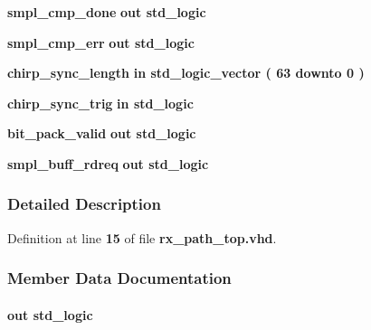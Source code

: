 \begin{DoxyCompactItemize}
\item 
{\bf smpl\+\_\+cmp\+\_\+done}  {\bfseries {\bfseries \textcolor{keywordflow}{out}\textcolor{vhdlchar}{ }}} {\bfseries \textcolor{comment}{std\+\_\+logic}\textcolor{vhdlchar}{ }} 
\item 
{\bf smpl\+\_\+cmp\+\_\+err}  {\bfseries {\bfseries \textcolor{keywordflow}{out}\textcolor{vhdlchar}{ }}} {\bfseries \textcolor{comment}{std\+\_\+logic}\textcolor{vhdlchar}{ }} 
\item 
{\bf chirp\+\_\+sync\+\_\+length}  {\bfseries {\bfseries \textcolor{keywordflow}{in}\textcolor{vhdlchar}{ }}} {\bfseries \textcolor{comment}{std\+\_\+logic\+\_\+vector}\textcolor{vhdlchar}{ }\textcolor{vhdlchar}{(}\textcolor{vhdlchar}{ }\textcolor{vhdlchar}{ } \textcolor{vhdldigit}{63} \textcolor{vhdlchar}{ }\textcolor{keywordflow}{downto}\textcolor{vhdlchar}{ }\textcolor{vhdlchar}{ } \textcolor{vhdldigit}{0} \textcolor{vhdlchar}{ }\textcolor{vhdlchar}{)}\textcolor{vhdlchar}{ }} 
\item 
{\bf chirp\+\_\+sync\+\_\+trig}  {\bfseries {\bfseries \textcolor{keywordflow}{in}\textcolor{vhdlchar}{ }}} {\bfseries \textcolor{comment}{std\+\_\+logic}\textcolor{vhdlchar}{ }} 
\item 
{\bf bit\+\_\+pack\+\_\+valid}  {\bfseries {\bfseries \textcolor{keywordflow}{out}\textcolor{vhdlchar}{ }}} {\bfseries \textcolor{comment}{std\+\_\+logic}\textcolor{vhdlchar}{ }} 
\item 
{\bf smpl\+\_\+buff\+\_\+rdreq}  {\bfseries {\bfseries \textcolor{keywordflow}{out}\textcolor{vhdlchar}{ }}} {\bfseries \textcolor{comment}{std\+\_\+logic}\textcolor{vhdlchar}{ }} 
\end{DoxyCompactItemize}


\subsubsection{Detailed Description}


Definition at line {\bf 15} of file {\bf rx\+\_\+path\+\_\+top.\+vhd}.



\subsubsection{Member Data Documentation}
\paragraph[{bit\+\_\+pack\+\_\+valid}]{ {\bfseries \textcolor{keywordflow}{out}\textcolor{vhdlchar}{ }} {\bfseries \textcolor{comment}{std\+\_\+logic}\textcolor{vhdlchar}{ }} \hspace{0.3cm}{\ttfamily [Port]}}\label{classrx__path__top_ab026d289e1122d09e7b20be7586420ac}


